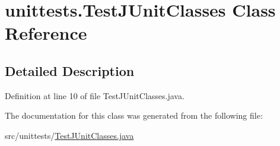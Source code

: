 \hypertarget{classunittests_1_1_test_j_unit_classes}{}\section{unittests.\+Test\+J\+Unit\+Classes Class Reference}
\label{classunittests_1_1_test_j_unit_classes}


\subsection{Detailed Description}


Definition at line 10 of file Test\+J\+Unit\+Classes.\+java.



The documentation for this class was generated from the following file\+:\begin{DoxyCompactItemize}
\item 
src/unittests/\hyperlink{_test_j_unit_classes_8java}{Test\+J\+Unit\+Classes.\+java}\end{DoxyCompactItemize}
